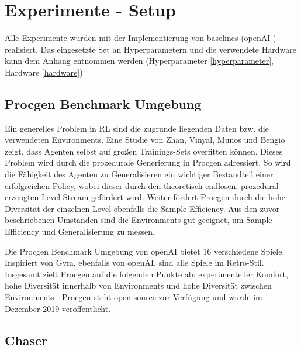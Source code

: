 \section{Experimente - Setup}\label{hauptabschnitt_4}

Alle Experimente wurden mit der Implementierung von baselines (openAI \cite{openai_baselines_code}) realisiert. Das eingesetzte Set an Hyperparametern und die verwendete Hardware kann dem Anhang entnommen werden (Hyperparameter \ref{hyperparameter}, Hardware \ref{hardware})

\subsection{Procgen Benchmark Umgebung}\label{absch_EXP_procgen}
Ein generelles Problem in RL sind die zugrunde liegenden Daten bzw. die verwendeten Environments. Eine Studie von Zhan, Vinyal, Munos und Bengio \cite{zhang2018study} zeigt, dass Agenten selbst auf großen Trainings-Sets overfitten können. Dieses Problem wird durch die prozedurale Generierung in Procgen \cite{cobbe2019procgen} adressiert. So wird die Fähigkeit des Agenten zu Generalisieren ein wichtiger Bestandteil einer erfolgreichen Policy, wobei dieser durch den theoretisch endlosen, prozedural erzeugten Level-Stream gefördert wird. Weiter fördert Procgen durch die hohe Diversität der einzelnen Level ebenfalls die Sample Efficiency. Aus den zuvor beschriebenen Umständen sind die Environments gut geeignet, um Sample Efficiency und Generalisierung zu messen.

Die Procgen Benchmark Umgebung von openAI bietet 16 verschiedene Spiele. Inspiriert von Gym\cite{brockman2016openAI_gym}, ebenfalls von openAI, sind alle Spiele im Retro-Stil. Insgesamt zielt Procgen auf die folgenden Punkte ab: experimenteller Komfort, hohe Diversität innerhalb von Environments und hohe Diversität zwischen Environments \cite{openAI_procgen_blog}. Procgen steht open source zur Verfügung und wurde im Dezember 2019 veröffentlicht. 

\subsection{Chaser}\label{absch_RL_chaser}

